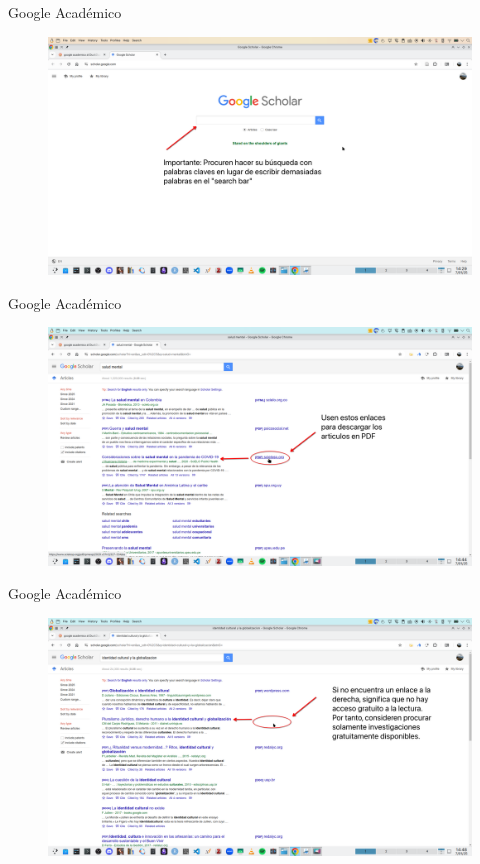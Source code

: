 \documentclass[
11pt, %
]{beamer}
\begin{document}
\begin{frame}{Google Académico}
	\begin{figure}[h!]
		\centering
		\includegraphics[width=12cm]{screenshot_20250107_142946 1.png}
	\end{figure}
\end{frame}

\begin{frame}{Google Académico}
	\begin{figure}[h!]
		\centering
		\includegraphics[width=12cm]{screenshot_20250107_144411 1.png}
	\end{figure}
\end{frame}

\begin{frame}{Google Académico}
	\begin{figure}[h!]
		\centering
		\includegraphics[width=12cm]{screenshot_20250107_144816 4.png}
	\end{figure}
\end{frame}
\end{document}
